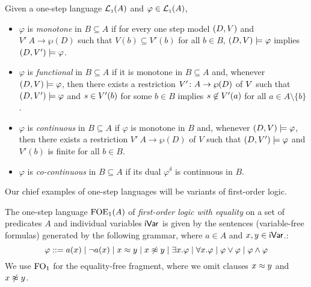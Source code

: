 \begin{definition}\label{def:semnotions} Given a one-step language $\mathcal{L}_{\scriptscriptstyle 1}(A)$ and $\varphi \in \mathcal{L}_{\scriptscriptstyle 1}(A)$,
\begin{itemize}
\item $\varphi$ is \emph{monotone} in $B \subseteq A$ if for every one step model $(D,V)$ and $V' \: A \to \wp(D)$ such that $V(b) \subseteq V'(b)$ for all $b \in B$, $(D,V) \models \varphi$ implies $(D,V') \models \varphi$.
\item $\varphi$ is \emph{functional} in $B\subseteq A$ if it is monotone in $B \subseteq A$ and, whenever $(D,V) \models \varphi$, then there exists a restriction $V' \colon A \to \wp(D)$ of $V$ such that $(D,V') \models \varphi$ and $s \in V'(b)$ for some $b \in B$ implies $s \not\in V'(a)$ for all $a \in A\setminus\{b\}$.
\item $\varphi$ is \emph{continuous} in $B \subseteq A$ if $\varphi$ is monotone in $B$ and, whenever $(D,V) \models \varphi$, then there exists a restriction $V' \: A \to \wp(D)$ of $V$ such that $(D,V') \models \varphi$ and $V'(b)$ is finite for all $b \in B$.
\item $\varphi$ is \emph{co-continuous} in $B \subseteq A$ if its dual $\varphi^{\delta}$ is continuous in $B$.
\end{itemize}
\end{definition}

Our chief examples of one-step languages will be variants of first-order logic.

\begin{definition}
The one-step language $\mathrm{FOE}_1(A)$ of \emph{first-order logic with equality} on a set of predicates $A$ and individual variables $\mathsf{iVar}$ is given by the sentences (variable-free formulas) generated by the following grammar, where $a \in A$ and $x,y\in\mathsf{iVar}$.:
\begin{equation}\label{eq:grammarofoe}
\varphi ::= a(x) \mid \lnot a(x) \mid x \foeq y \mid x \not\foeq y \mid \exists x.\varphi \mid \forall x.\varphi \mid \varphi \lor \varphi \mid \varphi \land \varphi
\end{equation}
We use $\mathrm{FO}_1$ for the equality-free fragment, where we omit clauses $x \approx y$ and $x \not\approx y$.
\end{definition}

